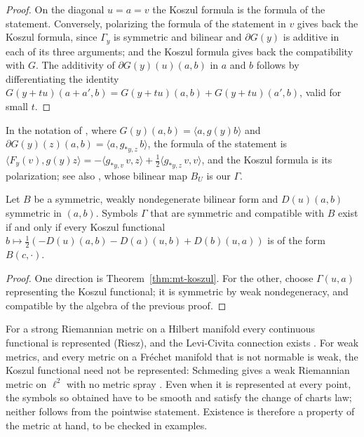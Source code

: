 \begin{proof}
  \leanok
  On the diagonal $u = a = v$ the Koszul formula is the formula of the statement. Conversely,
  polarizing the formula of the statement in $v$ gives back the Koszul formula, since $\Gamma_y$ is
  symmetric and bilinear and $\partial G(y)$ is additive in each of its three arguments; and the
  Koszul formula gives back the compatibility with $G$. The additivity of $\partial G(y)(u)(a, b)$
  in $a$ and $b$ follows by differentiating the identity
  $G(y + tu)(a + a', b) = G(y + tu)(a, b) + G(y + tu)(a', b)$, valid for small $t$.
\end{proof}

In the notation of \cite[Teorema 10.1.1]{Lar22}, where $G(y)(a, b) = \langle a, g(y) b\rangle$ and
$\partial G(y)(z)(a, b) = \langle a, g_{*y,z}\, b\rangle$, the formula of the statement is
$\langle F_y(v), g(y) z\rangle = -\langle g_{*y,v}\, v, z\rangle + \frac12 \langle g_{*y,z}\, v,
v\rangle$, and the Koszul formula is its polarization; see also \cite[Ch.~VIII, Theorem 4.2, MS 1]{Lan99}, whose bilinear map $B_U$ is our $\Gamma$.

\begin{proposition}
  \label{prop:mt-lc-existence}
  \leanok
  Let $B$ be a symmetric, weakly nondegenerate bilinear form and $D(u)(a, b)$ symmetric in $(a, b)$.
  Symbols $\Gamma$ that are symmetric and compatible with $B$ exist if and only if every Koszul
  functional $b \mapsto \frac12(-D(u)(a, b) - D(a)(u, b) + D(b)(u, a))$ is of the form $B(c, \cdot)$.
\end{proposition}

\begin{proof}
  \leanok
  One direction is Theorem~\ref{thm:mt-koszul}. For the other, choose $\Gamma(u, a)$ representing
  the Koszul functional; it is symmetric by weak nondegeneracy, and compatible by the algebra of the
  previous proof.
\end{proof}

\begin{remark}
  For a strong Riemannian metric on a Hilbert manifold every continuous functional is represented
  (Riesz), and the Levi-Civita connection exists \cite[Ch.~VIII, Theorem 4.1]{Lan99}. For weak metrics, and
  every metric on a Fréchet manifold that is not normable is weak, the Koszul functional need not be
  represented: Schmeding gives a weak Riemannian metric on $\ell^2$ with no metric spray
  \cite[Example 4.3.7]{Sch23}. Even when it is represented at every point, the symbols so obtained
  have to be smooth and satisfy the change of charts law; neither follows from the pointwise
  statement. Existence is therefore a property of the metric at hand, to be checked in examples.
\end{remark}

